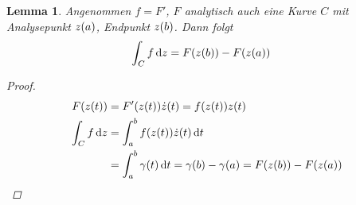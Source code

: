 \documentclass[11pt, a4paper]{article}
\theoremstyle{plain}
\newtheorem{lemma}[blockelement]{Lemma}
\numberwithin{equation}{subsection}
\newcommand{\of}[1]{\mathopen{}\mathclose{}\bgroup\left(#1\aftergroup\egroup\right)}
\newcommand{\dif}{\mathop{}\!\mathrm{d}}
\begin{document}
    \begin{lemma}
        Angenommen $f = F'$, $F$ analytisch auch eine Kurve $C$ mit Analysepunkt $z\of{a}$, Endpunkt $z\of{b}$. Dann folgt
        \begin{align*}
            \int_{C}^{} f \dif z &= F\of{z\of{b}} - F\of{z\of{a}}
        \end{align*}

        \begin{proof}
            \begin{align*}
                F\of{z\of{t}} &= F'\of{z\of{t}}\dot z\of{t} = f\of{z\of{t}}z\of{t}\\
                \int_{C}^{} f \dif z &= \int_{a}^{b} f\of{z\of{t}}\dot z\of{t} \dif t\\
                &= \int_{a}^{b} \gamma\of{t}  \dif t = \gamma\of{b} - \gamma\of{a} = F\of{z\of{b}} - F\of{z\of{a}}\qedhere
            \end{align*}
        \end{proof}
    \end{lemma}
\end{document}
